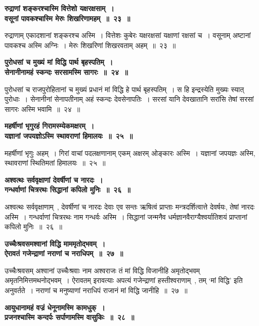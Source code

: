  \begin{center}{\bfseries रुद्राणां शङ्करश्चास्मि वित्तेशो यक्षरक्षसाम्~।\\वसूनां पावकश्चास्मि मेरुः शिखरिणामहम्~॥~२३~॥}\end{center} 
रुद्राणाम् एकादशानां शङ्करश्च अस्मि~। वित्तेशः कुबेरः यक्षरक्षसां यक्षाणां रक्षसां च~। वसूनाम् अष्टानां पावकश्च अस्मि अग्निः~। मेरुः शिखरिणां शिखरवताम् अहम्~॥~२३~॥\par
 \begin{center}{\bfseries पुरोधसां च मुख्यं मां विद्धि पार्थ बृहस्पतिम्~।\\सेनानीनामहं स्कन्दः सरसामस्मि सागरः~॥~२४~॥}\end{center} 
पुरोधसां च राजपुरोहितानां च मुख्यं प्रधानं मां विद्धि हे पार्थ बृहस्पतिम्~। स हि इन्द्रस्येति मुख्यः स्यात् पुरोधाः~। सेनानीनां सेनापतीनाम् अहं स्कन्दः देवसेनापतिः~। सरसां यानि देवखातानि सरांसि तेषां सरसां सागरः अस्मि भवामि~॥~२४~॥\par
 \begin{center}{\bfseries महर्षीणां भृगुरहं गिरामस्म्येकमक्षरम्~।\\यज्ञानां जपयज्ञोऽस्मि स्थावराणां हिमालयः~॥~२५~॥}\end{center} 
महर्षीणां भृगुः अहम्~। गिरां वाचां पदलक्षणानाम् एकम् अक्षरम् ओङ्कारः अस्मि~। यज्ञानां जपयज्ञः अस्मि, स्थावराणां स्थितिमतां हिमालयः~॥~२५~॥\par
 \begin{center}{\bfseries अश्वत्थः सर्ववृक्षाणां देवर्षीणां च नारदः~।\\गन्धर्वाणां चित्ररथः सिद्धानां कपिलो मुनिः~॥~२६~॥}\end{center} 
अश्वत्थः सर्ववृक्षाणाम्~, देवर्षीणां च नारदः देवाः एव सन्तः ऋषित्वं प्राप्ताः मन्त्रदर्शित्वात्ते देवर्षयः, तेषां नारदः अस्मि~। गन्धर्वाणां चित्ररथः नाम गन्धर्वः अस्मि~। सिद्धानां जन्मनैव धर्मज्ञानवैराग्यैश्वर्यातिशयं प्राप्तानां कपिलो मुनिः~॥~२६~॥\par
 \begin{center}{\bfseries उच्चैःश्रवसमश्वानां विद्धि माममृतोद्भवम्~।\\ऐरावतं गजेन्द्राणां नराणां च नराधिपम्~॥~२७~॥}\end{center} 
उच्चैःश्रवसम् अश्वानां उच्चैःश्रवाः नाम अश्वराजः तं मां विद्धि विजानीहि अमृतोद्भवम् अमृतनिमित्तमथनोद्भवम्~। ऐरावतम् इरावत्याः अपत्यं गजेन्द्राणां हस्तीश्वराणाम्~, तम् ‘मां विद्धि’ इति अनुवर्तते~। नराणां च मनुष्याणां नराधिपं राजानं मां विद्धि जानीहि~॥~२७~॥\par
 \begin{center}{\bfseries आयुधानामहं वज्रं धेनूनामस्मि कामधुक्~।\\प्रजनश्चास्मि कन्दर्पः सर्पाणामस्मि वासुकिः~॥~२८~॥}\end{center} 
